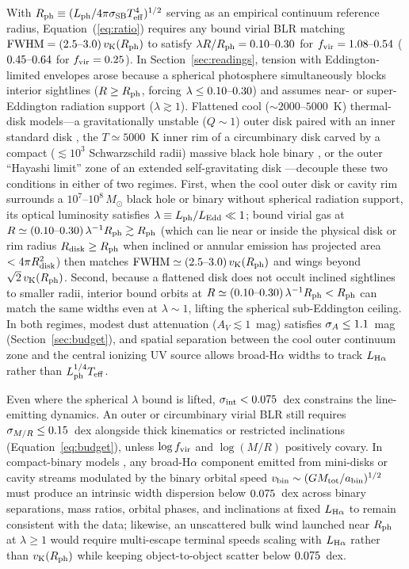 \documentclass[twocolumn,linenumbers]{aastex701}
\newcommand{\Ha}{H$\alpha$}
\newcommand{\sigint}{\sigma_{\rm int}}
\newcommand{\LHa}{L_{\rm H\alpha}}
\newcommand{\Lph}{L_{\rm ph}}
\newcommand{\Rph}{R_{\rm ph}}
\newcommand{\Teff}{T_{\rm eff}}
\newcommand{\vK}{v_{\rm K}}
\providecommand{\Msun}{M_\odot}
\begin{document}
With $\Rph\equiv(\Lph/4\pi\sigma_{\rm SB}\Teff^{4})^{1/2}$ serving as an empirical continuum reference radius, Equation~(\ref{eq:ratio}) requires any bound virial BLR matching ${\rm FWHM}=(\ratLo{}\text{--}\ratHi{})\,\vK(\Rph)$ to satisfy $\lambda R/\Rph=\lamVirLo{}\text{--}\lamIsoHi{}$ for $f_{\rm vir}=1.08\text{--}0.54$ ($0.45{}\text{--}0.64{}$ for $f_{\rm vir}=0.25$).
In Section~\ref{sec:readings}, tension with Eddington-limited envelopes arose because a spherical photosphere simultaneously blocks interior sightlines ($R\geq\Rph$, forcing $\lambda\leq0.10{}\text{--}0.30{}$) and assumes near- or super-Eddington radiation support ($\lambda\gtrsim1$).
Flattened cool ($\sim2000$--$5000$~K) thermal-disk models---a gravitationally unstable ($Q\sim1$) outer disk paired with an inner standard disk \citep{ZhangCX2026}, the $T\simeq5000$~K inner rim of a circumbinary disk carved by a compact ($\lesssim10^{3}$ Schwarzschild radii) massive black hole binary \citep{InayoshiChen2026}, or the outer ``Hayashi limit'' zone of an extended self-gravitating disk \citep{ChenYX2026}---decouple these two conditions in either of two regimes.
First, when the cool outer disk or cavity rim surrounds a $10^{7}$--$10^{8}\,\Msun$ black hole or binary without spherical radiation support, its optical luminosity satisfies $\lambda\equiv\Lph/L_{\rm Edd}\ll1$; bound virial gas at $R\simeq(\lamVirLo{}\text{--}\lamIsoHi{})\,\lambda^{-1}\Rph\gtrsim\Rph$ (which can lie near or inside the physical disk or rim radius $R_{\rm disk}\geq\Rph$ when inclined or annular emission has projected area $<4\pi R_{\rm disk}^{2}$) then matches ${\rm FWHM}\simeq(\ratLo{}\text{--}\ratHi{})\,\vK(\Rph)$ and wings beyond $\sqrt{2}\,\vK(\Rph)$.
Second, because a flattened disk does not occult inclined sightlines to smaller radii, interior bound orbits at $R\simeq(\lamVirLo{}\text{--}\lamIsoHi{})\,\lambda^{-1}\Rph<\Rph$ can match the same widths even at $\lambda\sim1$, lifting the spherical sub-Eddington ceiling.
In both regimes, modest dust attenuation ($A_V\lesssim1$~mag) satisfies $\sigma_A\leq1.1{}$~mag (Section~\ref{sec:budget}), and spatial separation between the cool outer continuum zone and the central ionizing UV source allows broad-\Ha{} widths to track $\LHa$ rather than $\Lph^{1/4}\Teff$.

Even where the spherical $\lambda$ bound is lifted, $\sigint<\FsigUp{}$~dex constrains the line-emitting dynamics.
An outer or circumbinary virial BLR still requires $\sigma_{M/R}\leq0.15{}$~dex alongside thick kinematics or restricted inclinations (Equation~\ref{eq:budget}), unless $\log f_{\rm vir}$ and $\log(M/R)$ positively covary.
In compact-binary models \citep{InayoshiChen2026}, any broad-\Ha{} component emitted from mini-disks or cavity streams modulated by the binary orbital speed $v_{\rm bin}\sim(GM_{\rm tot}/a_{\rm bin})^{1/2}$ must produce an intrinsic width dispersion below $0.075{}$~dex across binary separations, mass ratios, orbital phases, and inclinations at fixed $\LHa$ to remain consistent with the data; likewise, an unscattered bulk wind launched near $\Rph$ at $\lambda\geq1$ would require multi-escape terminal speeds scaling with $\LHa$ rather than $\vK(\Rph)$ while keeping object-to-object scatter below $0.075{}$~dex.
\end{document}
